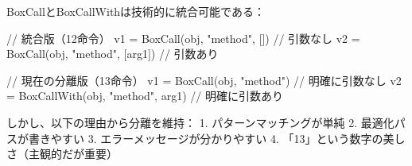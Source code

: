\documentclass[
]{article}
\newenvironment{Shaded}{}{}
\newcommand{\NormalTok}[1]{#1}
\begin{document}
BoxCallとBoxCallWithは技術的に統合可能である：

\begin{Shaded}
\begin{Highlighting}[]
\NormalTok{// 統合版（12命令）}
\NormalTok{v1 = BoxCall(obj, "method", [])      // 引数なし}
\NormalTok{v2 = BoxCall(obj, "method", [arg1])  // 引数あり}

\NormalTok{// 現在の分離版（13命令）  }
\NormalTok{v1 = BoxCall(obj, "method")          // 明確に引数なし}
\NormalTok{v2 = BoxCallWith(obj, "method", arg1) // 明確に引数あり}
\end{Highlighting}
\end{Shaded}

しかし、以下の理由から分離を維持： 1. パターンマッチングが単純 2.
最適化パスが書きやすい 3. エラーメッセージが分かりやすい 4.
「13」という数字の美しさ（主観的だが重要）
\end{document}
